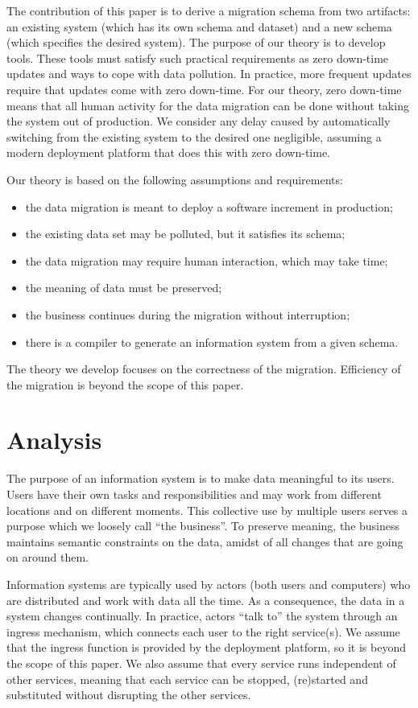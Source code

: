 \documentclass{elsarticle}
\begin{document}
   The contribution of this paper is to derive a migration schema from two artifacts: an existing system
   (which has its own schema and dataset) and a new schema (which specifies the desired system).
   The purpose of our theory is to develop tools.
   These tools must satisfy such practical requirements as
   zero down-time updates and ways to cope with data pollution.
   In practice, more frequent updates require that updates come with zero down-time.
   For our theory, zero down-time means that all human activity for the data migration can be done without taking the system out of production.
   We consider any delay caused by automatically switching from the existing system to the desired one negligible,
   assuming a modern deployment platform that does this with zero down-time.
   
   Our theory is based on the following assumptions and requirements:
\begin{itemize}
   \item the data migration is meant to deploy a software increment in production;
   \item the existing data set may be polluted, but it satisfies its schema;
   \item the data migration may require human interaction, which may take time;
   \item the meaning of data must be preserved;
   \item the business continues during the migration without interruption;
   \item there is a compiler to generate an information system from a given schema.
\end{itemize}
   The theory we develop focuses on the correctness of the migration.
   Efficiency of the migration is beyond the scope of this paper.

\section{Analysis}
   The purpose of an information system is to make data meaningful to its users.
   Users have their own tasks and responsibilities
   and may work from different locations and on different moments.
   This collective use by multiple users serves a purpose which we loosely call ``the business''.
   To preserve meaning, the business maintains semantic constraints on the data,
   amidst of all changes that are going on around them.
   
   Information systems are typically used by actors (both users and computers) who are distributed and work with data all the time.
   As a consequence, the data in a system changes continually.
   In practice, actors ``talk to'' the system through an ingress mechanism, which connects each user to the right service(s).
   We assume that the ingress function is provided by the deployment platform, so it is beyond the scope of this paper.
   We also assume that every service runs independent of other services,
   meaning that each service can be stopped, (re)started and substituted without disrupting the other services.
\end{document}
